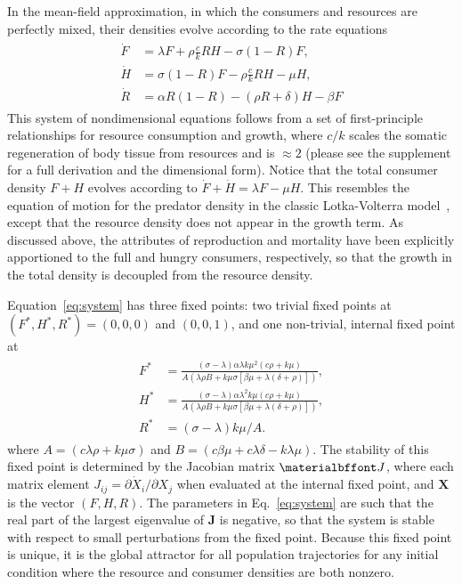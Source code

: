 \documentclass{pnastwo}
\begin{document}
\begin{article}
In the mean-field approximation, in which the consumers and resources are perfectly mixed, their densities evolve according to the rate equations
\begin{align}
\label{eq:system}
\begin{split}
\dot{F} &= \lambda F + \rho \frac{c}{k} RH - \sigma \left(1-R\right)F,  \\
\dot{H} &= \sigma \left(1-R\right)F - \rho \frac{c}{k} RH - \mu H,  \\
\dot{R} &= \alpha R\left(1-R\right) -\left(\rho R+\delta\right)H-\beta F
\end{split}
\end{align}
{\color{red} This system of nondimensional equations follows from a set of first-principle relationships for resource consumption and growth, where $c/k$ scales the somatic regeneration of body tissue from resources and is $\approx 2$ (please see the supplement for a full derivation and the dimensional form).
}
Notice that the total consumer density $F+H$ evolves according to $\dot{F}+\dot{H}=\lambda F-\mu H$.
This resembles the equation of motion for the predator density in the classic Lotka-Volterra model~\cite{murray2011mathematical}, except that the resource density does not appear in the growth term.
As discussed above, the attributes of reproduction and mortality have been explicitly apportioned to the full and hungry consumers, respectively, so that the growth in the total density is decoupled from the resource density.

Equation~\eqref{eq:system} has three fixed points: two trivial fixed points at $(F^*,H^*,R^*)=(0,0,0)$ and $(0,0,1)$, and one non-trivial, internal fixed point at
\begin{align}
\label{eq:ss}
\begin{split}
F^* &= \frac{(\sigma -\lambda ) \alpha  \lambda  k \mu ^2  (c \rho +k \mu )}{A (\lambda  \rho B +k \mu  \sigma  [\beta  \mu +\lambda  (\delta +\rho )])}, \\
H^* &= \frac{(\sigma -\lambda ) \alpha  \lambda ^2 k \mu  (c \rho +k \mu )}{A (\lambda  \rho  B+k \mu  \sigma  [\beta  \mu +\lambda  (\delta +\rho )])}, \\
R^* &= (\sigma -\lambda )k \mu /A.
\end{split}
\end{align}
where $A=(c \lambda  \rho +k \mu  \sigma )$ and $B=(c\beta \mu + c \lambda \delta - k \lambda \mu)$. The stability of this fixed point is determined by the Jacobian matrix $\bf J$, where each matrix element $J_{ij}=\partial{\dot X_i}/\partial{X_j}$ when evaluated at the internal fixed point, and $\mathbf{X}$ is the vector $(F,H,R)$.
The parameters in Eq.~\eqref{eq:system} are such that the real part of the largest eigenvalue of $\mathbf{J}$ is negative, so that the system is stable with respect to small perturbations from the fixed point.
Because this fixed point is unique, it is the global attractor for all population trajectories for any initial condition where the resource and consumer densities are both nonzero.


\end{article}
\end{document}
